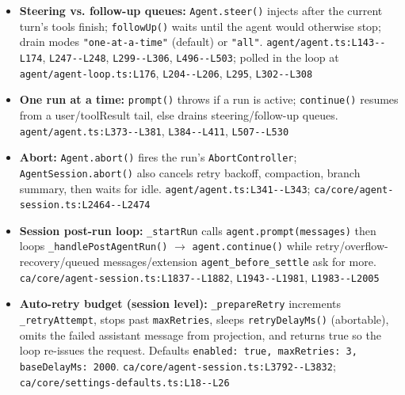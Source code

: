 \begin{itemize}
\item \textbf{Steering vs. follow-up queues:} \texttt{Agent.\allowbreak{}steer(\allowbreak{})} injects after the current turn's tools finish; \texttt{followUp(\allowbreak{})} waits until the agent would otherwise stop; drain modes \texttt{"one-\allowbreak{}at-\allowbreak{}a-\allowbreak{}time"} (default) or \texttt{"all"}. \texttt{agent/\allowbreak{}agent.\allowbreak{}ts:\allowbreak{}L143-\allowbreak{}-\allowbreak{}L174}, \texttt{L247-\allowbreak{}-\allowbreak{}L248}, \texttt{L299-\allowbreak{}-\allowbreak{}L306}, \texttt{L496-\allowbreak{}-\allowbreak{}L503}; polled in the loop at \texttt{agent/\allowbreak{}agent-\allowbreak{}loop.\allowbreak{}ts:\allowbreak{}L176}, \texttt{L204-\allowbreak{}-\allowbreak{}L206}, \texttt{L295}, \texttt{L302-\allowbreak{}-\allowbreak{}L308}
\item \textbf{One run at a time:} \texttt{prompt(\allowbreak{})} throws if a run is active; \texttt{continue(\allowbreak{})} resumes from a user/toolResult tail, else drains steering/follow-up queues. \texttt{agent/\allowbreak{}agent.\allowbreak{}ts:\allowbreak{}L373-\allowbreak{}-\allowbreak{}L381}, \texttt{L384-\allowbreak{}-\allowbreak{}L411}, \texttt{L507-\allowbreak{}-\allowbreak{}L530}
\item \textbf{Abort:} \texttt{Agent.\allowbreak{}abort(\allowbreak{})} fires the run's \texttt{AbortController}; \texttt{AgentSession.\allowbreak{}abort(\allowbreak{})} also cancels retry backoff, compaction, branch summary, then waits for idle. \texttt{agent/\allowbreak{}agent.\allowbreak{}ts:\allowbreak{}L341-\allowbreak{}-\allowbreak{}L343}; \texttt{ca/\allowbreak{}core/\allowbreak{}agent-\allowbreak{}session.\allowbreak{}ts:\allowbreak{}L2464-\allowbreak{}-\allowbreak{}L2474}
\item \textbf{Session post-run loop:} \texttt{\_\allowbreak{}startRun} calls \texttt{agent.\allowbreak{}prompt(\allowbreak{}messages)} then loops \texttt{\_\allowbreak{}handlePostAgentRun(\allowbreak{})} $\rightarrow$ \texttt{agent.\allowbreak{}continue(\allowbreak{})} while retry/overflow-recovery/queued messages/extension \texttt{agent\_\allowbreak{}before\_\allowbreak{}settle} ask for more. \texttt{ca/\allowbreak{}core/\allowbreak{}agent-\allowbreak{}session.\allowbreak{}ts:\allowbreak{}L1837-\allowbreak{}-\allowbreak{}L1882}, \texttt{L1943-\allowbreak{}-\allowbreak{}L1981}, \texttt{L1983-\allowbreak{}-\allowbreak{}L2005}
\item \textbf{Auto-retry budget (session level):} \texttt{\_\allowbreak{}prepareRetry} increments \texttt{\_\allowbreak{}retryAttempt}, stops past \texttt{maxRetries}, sleeps \texttt{retryDelayMs(\allowbreak{})} (abortable), omits the failed assistant message from projection, and returns true so the loop re-issues the request. Defaults \texttt{enabled:\allowbreak{} true, maxRetries:\allowbreak{} 3, baseDelayMs:\allowbreak{} 2000}. \texttt{ca/\allowbreak{}core/\allowbreak{}agent-\allowbreak{}session.\allowbreak{}ts:\allowbreak{}L3792-\allowbreak{}-\allowbreak{}L3832}; \texttt{ca/\allowbreak{}core/\allowbreak{}settings-\allowbreak{}defaults.\allowbreak{}ts:\allowbreak{}L18-\allowbreak{}-\allowbreak{}L26}

\end{itemize}
